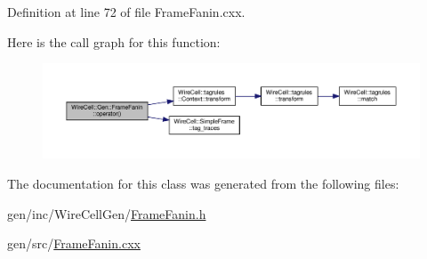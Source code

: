 Definition at line 72 of file Frame\+Fanin.\+cxx.

Here is the call graph for this function\+:
\nopagebreak
\begin{figure}[H]
\begin{center}
\leavevmode
\includegraphics[width=350pt]{class_wire_cell_1_1_gen_1_1_frame_fanin_a07a4dc2a3d5126a5540613534c73b914_cgraph}
\end{center}
\end{figure}


The documentation for this class was generated from the following files\+:\begin{DoxyCompactItemize}
\item 
gen/inc/\+Wire\+Cell\+Gen/\hyperlink{_frame_fanin_8h}{Frame\+Fanin.\+h}\item 
gen/src/\hyperlink{_frame_fanin_8cxx}{Frame\+Fanin.\+cxx}\end{DoxyCompactItemize}
